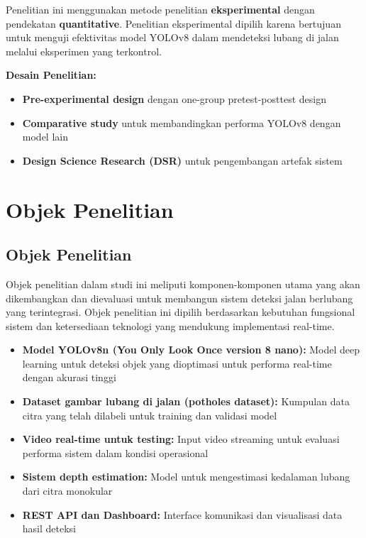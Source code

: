 \documentclass[12pt,a4paper]{report}
\begin{document}
Penelitian ini menggunakan metode penelitian \textbf{eksperimental} dengan pendekatan \textbf{quantitative}. Penelitian eksperimental dipilih karena bertujuan untuk menguji efektivitas model YOLOv8 dalam mendeteksi lubang di jalan melalui eksperimen yang terkontrol.

\textbf{Desain Penelitian:}
\begin{itemize}
    \item \textbf{Pre-experimental design} dengan one-group pretest-posttest design
    \item \textbf{Comparative study} untuk membandingkan performa YOLOv8 dengan model lain
    \item \textbf{Design Science Research (DSR)} untuk pengembangan artefak sistem
\end{itemize}

\section{Objek Penelitian}

\subsection{Objek Penelitian}

Objek penelitian dalam studi ini meliputi komponen-komponen utama yang akan dikembangkan dan dievaluasi untuk membangun sistem deteksi jalan berlubang yang terintegrasi. Objek penelitian ini dipilih berdasarkan kebutuhan fungsional sistem dan ketersediaan teknologi yang mendukung implementasi real-time.

\begin{itemize}
    \item \textbf{Model YOLOv8n (You Only Look Once version 8 nano):} Model deep learning untuk deteksi objek yang dioptimasi untuk performa real-time dengan akurasi tinggi
    \item \textbf{Dataset gambar lubang di jalan (potholes dataset):} Kumpulan data citra yang telah dilabeli untuk training dan validasi model
    \item \textbf{Video real-time untuk testing:} Input video streaming untuk evaluasi performa sistem dalam kondisi operasional
    \item \textbf{Sistem depth estimation:} Model untuk mengestimasi kedalaman lubang dari citra monokular
    \item \textbf{REST API dan Dashboard:} Interface komunikasi dan visualisasi data hasil deteksi
\end{itemize}
\end{document}
